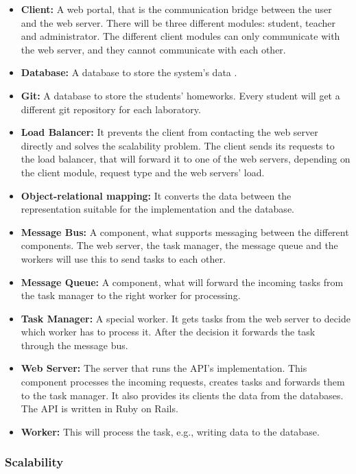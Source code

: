 \begin{itemize}
	\item \textbf{Client:} A web portal, that is the communication bridge between the user and the web server. There will be three different modules: student, teacher and administrator. The different client modules can only communicate with the web server, and they cannot communicate with each other.
	\item \textbf{Database:} A database to store the system's data . 
	\item \textbf{Git:} A database to store the students' homeworks. Every student will get a different git repository for each laboratory.
	\item \textbf{Load Balancer:} It prevents the client from contacting the web server directly and solves the scalability problem. The client sends its requests to the load balancer, that will forward it to one of the web servers, depending on the client module, request type and the web servers' load.
	\item \textbf{Object-relational mapping:} It converts the data between the representation suitable for the implementation and the database. 
	\item \textbf{Message Bus:} A component, what supports messaging between the different components. The web server, the task manager, the message queue and the workers will use this to send tasks to each other.
	\item \textbf{Message Queue:} A component, what will forward the incoming tasks from the task manager to the right worker for processing. 
	\item \textbf{Task Manager:} A special worker. It gets tasks from the web server to decide which worker has to process it. After the decision it forwards the task through the message bus.
	\item \textbf{Web Server:} The server that runs the API's implementation. This component processes the incoming requests, creates tasks and forwards them to the task manager. It also provides its clients the data from the databases. The API is written in Ruby on Rails. 
	\item \textbf{Worker:} This will process the task, e.g., writing data to the database.
\end{itemize}

\subsubsection{Scalability}

